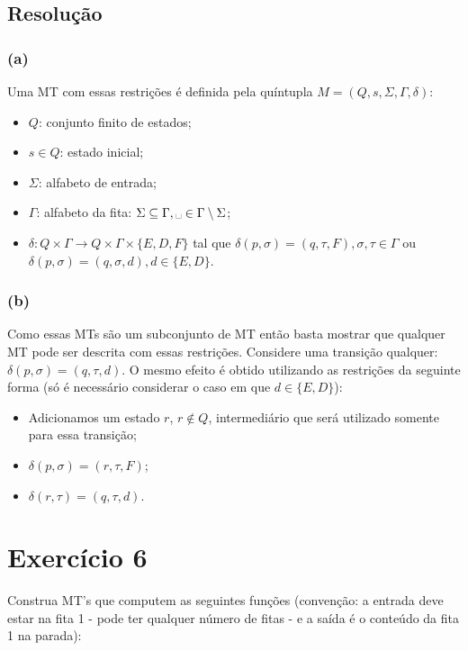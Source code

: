 \documentclass{article}
\begin{document}
\subsection{Resolução}

\subsubsection{(a)}

Uma MT com essas restrições é definida pela quíntupla $M=(Q,s,\Sigma,\Gamma,\delta)$:

\begin{itemize}
	\item $Q$: conjunto finito de estados;
	\item $s\in Q$: estado inicial;
	\item $\Sigma$: alfabeto de entrada;
	\item $\Gamma$: alfabeto da fita: $\Sigma\subseteq\Gamma,\text{\textvisiblespace}\in\Gamma\setminus\Sigma$;
	\item $\delta: Q\times\Gamma\rightarrow Q\times\Gamma\times\{E,D,F\}$ tal que $\delta(p,\sigma) = (q,\tau,F), \sigma,\tau\in\Gamma$ ou $\delta(p,\sigma) = (q,\sigma,d), d\in\{E,D\}$.
\end{itemize}

\subsubsection{(b)}

Como essas MTs são um subconjunto de MT então basta mostrar que qualquer MT pode ser descrita com essas restrições. Considere uma transição qualquer: $\delta(p,\sigma) = (q,\tau,d)$. O mesmo efeito é obtido utilizando as restrições da seguinte forma (só é necessário considerar o caso em que $d\in\{E,D\}$): 

\begin{itemize}
	\item Adicionamos um estado $r$, $r\not\in Q$, intermediário que será utilizado somente para essa transição;
	\item $\delta(p,\sigma) = (r,\tau,F)$;
	\item $\delta(r,\tau) = (q,\tau,d)$.
\end{itemize}

\section{Exercício 6}

Construa MT's que computem as seguintes funções (convenção: a entrada deve estar na fita 1 - pode ter qualquer número de fitas - e a saída é o conteúdo da fita 1 na parada):
\end{document}
